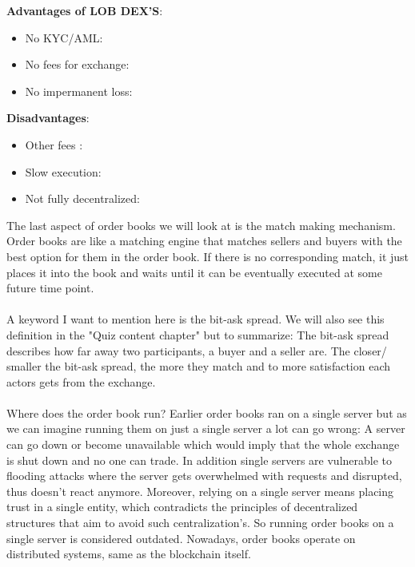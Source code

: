 \documentclass{article}
\begin{document}
\textbf{Advantages of LOB DEX'S}:
\begin{itemize}
    \item {No KYC/AML}: 
    \item {No fees for exchange}: 
    \item {No impermanent loss}: 
\end{itemize}
\textbf{Disadvantages}:
\begin{itemize}
    \item {Other fees }: 
    \item {Slow execution}: 
    \item {Not fully decentralized}:  
\end{itemize}
The last aspect of order books we will look at is the match making mechanism. Order books are like a matching engine that matches sellers and buyers with the best option for them in the order book. If there is no corresponding match, it just places it into the book and waits until it can be eventually executed at some future time point.\\
\\
A keyword I want to mention here is the bit-ask spread. We will also see this definition in the "Quiz content chapter" but to summarize: The bit-ask spread describes how far away two participants, a buyer and a seller are. The closer/ smaller the bit-ask spread, the more they match and to more satisfaction each actors gets from the exchange.\\
\\
Where does the order book run? Earlier order books ran on a single server but as we can imagine running them on just a single server a lot can go wrong: A server can go down or become unavailable which would imply that the whole exchange is shut down and no one can trade. In addition single servers are vulnerable to flooding attacks where the server gets overwhelmed with requests and disrupted, thus doesn't react anymore. Moreover, relying on a single server means placing trust in a single entity, which contradicts the principles of decentralized structures that aim to avoid such centralization's. So running order books on a single server is considered outdated. Nowadays, order books operate on distributed systems, same as the blockchain itself.
\end{document}
